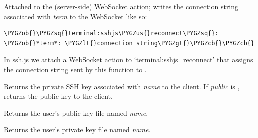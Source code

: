 \documentclass[letterpaper,10pt,openany]{sphinxmanual}
\def\PYGZus{\char`\_}
\def\PYGZob{\char`\{}
\def\PYGZcb{\char`\}}
\def\PYGZlt{\char`\<}
\def\PYGZgt{\char`\>}
\def\PYGZsq{\char`\'}
\begin{document}

\begin{fulllineitems}
\label{Applications/terminal/plugin_ssh:ssh.get_connect_string}
Attached to the (server-side)  WebSocket
action; writes the connection string associated with \emph{term} to the WebSocket
like so:

\begin{Verbatim}[commandchars=\\\{\}]
\PYGZob{}\PYGZsq{}terminal:sshjs\PYGZus{}reconnect\PYGZsq{}: \PYGZob{}*term*: \PYGZlt{}connection string\PYGZgt{}\PYGZcb{}\PYGZcb{}
\end{Verbatim}

In ssh.js we attach a WebSocket action to `terminal:sshjs\_reconnect'
that assigns the connection string sent by this function to
.

\end{fulllineitems}


\begin{fulllineitems}
\label{Applications/terminal/plugin_ssh:ssh.get_key}
Returns the private SSH key associated with \emph{name} to the client.  If
\emph{public} is , returns the public key to the client.

\end{fulllineitems}


\begin{fulllineitems}
\label{Applications/terminal/plugin_ssh:ssh.get_public_key}
Returns the user's public key file named \emph{name}.

\end{fulllineitems}


\begin{fulllineitems}
\label{Applications/terminal/plugin_ssh:ssh.get_private_key}
Returns the user's private key file named \emph{name}.

\end{fulllineitems}
\end{document}
